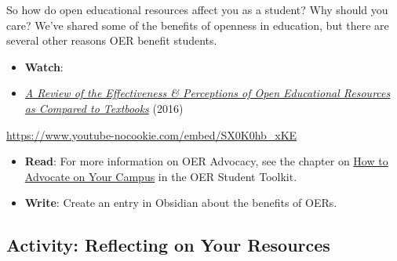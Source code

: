 \documentclass[
  letterpaper,
  DIV=11,
  numbers=noendperiod]{scrreprt}
\providecommand{\tightlist}{%
  \setlength{\itemsep}{0pt}\setlength{\parskip}{0pt}}\usepackage{longtable,booktabs,array}
\begin{document}
\begin{tcolorbox}[enhanced jigsaw, toprule=.15mm, colback=white, colframe=quarto-callout-note-color-frame, bottomtitle=1mm, leftrule=.75mm, coltitle=black, titlerule=0mm, rightrule=.15mm, colbacktitle=quarto-callout-note-color!10!white, left=2mm, title={Learning Activity}, opacitybacktitle=0.6, opacityback=0, breakable, toptitle=1mm, arc=.35mm, bottomrule=.15mm]

So how do open educational resources affect you as a student? Why should
you care? We've shared some of the benefits of openness in education,
but there are several other reasons OER benefit students.

\begin{itemize}
\tightlist
\item
  \textbf{Watch}:
\item
  \href{https://www.youtube.com/watch?v=SX0K0hb_xKE}{\emph{A Review of
  the Effectiveness \& Perceptions of Open Educational Resources as
  Compared to Textbooks}} (2016)
\end{itemize}

\url{https://www.youtube-nocookie.com/embed/SX0K0hb_xKE}

\begin{itemize}
\tightlist
\item
  \textbf{Read}: For more information on OER Advocacy, see the chapter
  on
  \href{https://opentextbc.ca/studenttoolkit/chapter/step-three-how-to-advocate-on-your-campus/}{How
  to Advocate on Your Campus} in the OER Student Toolkit.
\item
  \textbf{Write}: Create an entry in Obsidian about the benefits of
  OERs.
\end{itemize}

\end{tcolorbox}

\subsection{Activity: Reflecting on Your
Resources}\label{activity-reflecting-on-your-resources}
\end{document}
